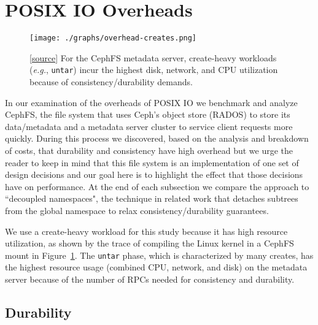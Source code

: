 \section{POSIX IO Overheads}
\label{sec:posix-overheads}

\begin{figure}[tb] \centering
\texttt{[image: ./graphs/overhead-creates.png]}
\caption{[\href{https://github.com/michaelsevilla/cudele-popper/blob/master/experiments/baseline-compile/visualize/viz.ipynb}{source}]
For the CephFS metadata server, create-heavy workloads ({\it e.g.},
\texttt{untar}) incur the highest disk, network, and CPU utilization because of
consistency/durability demands.\vspace{-3ex}}\label{fig:overhead-creates}
\end{figure}

In our examination of the overheads of POSIX IO we benchmark and analyze
CephFS, the file system that uses Ceph's object store (RADOS) to
store its data/metadata and a metadata server cluster to service client requests
more quickly.  During this process we discovered, based on the analysis and
breakdown of costs, that durability and consistency have high overhead but we
urge the reader to keep in mind that this file system is an implementation of
one set of design decisions and our goal here is to highlight the effect that
those decisions have on performance.  At the end of each subsection we compare
the approach to ``decoupled namespaces", the technique in related work that
detaches subtrees from the global namespace to relax consistency/durability
guarantees. 


We use a create-heavy workload for this study because it has high resource
utilization, as shown by the trace of compiling the Linux kernel in a CephFS
mount in Figure~\ref{fig:overhead-creates}.  The \texttt{untar} phase, which is
characterized by many creates, has the highest resource usage (combined CPU,
network, and disk) on the metadata server because of the number of RPCs needed
for consistency and durability.  

\subsection{Durability}
\label{sec:durability}

